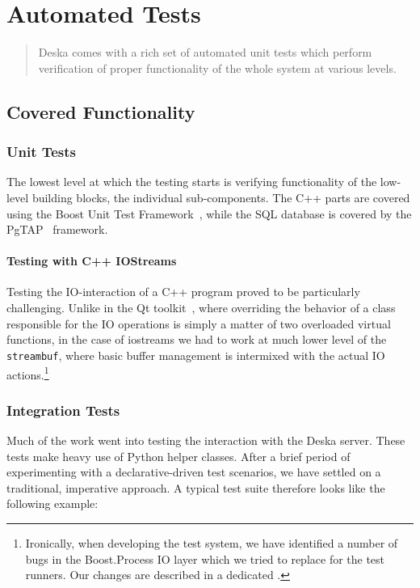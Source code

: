 \documentclass[deska]{subfiles}
\begin{document}
\chapter{Automated Tests}
\label{sec:automated-tests}

\begin{abstract}
Deska comes with a rich set of automated unit tests which perform verification of proper functionality of the whole
system at various levels.
\end{abstract}

\section{Covered Functionality}

\subsection{Unit Tests}

The lowest level at which the testing starts is verifying functionality of the low-level building blocks, the individual
sub-components.  The C++ parts are covered using the Boost Unit Test Framework~\cite{boost-testing}, while the SQL
database is covered by the PgTAP~\cite{pgtap} framework.

\subsubsection{Testing with C++ IOStreams}

Testing the IO-interaction of a C++ program proved to be particularly challenging.  Unlike in the Qt toolkit~\cite{qt},
where overriding the behavior of a class responsible for the IO operations is simply a matter of two overloaded virtual
functions, in the case of iostreams we had to work at much lower level of the {\tt streambuf}, where basic buffer
management is intermixed with the actual IO actions.\footnote{Ironically, when developing the test system, we have
identified a number of bugs in the Boost.Process IO layer which we tried to replace for the test runners.  Our changes
are described in a dedicated .}

\subsection{Integration Tests}

Much of the work went into testing the interaction with the Deska server.  These tests make heavy use of Python helper
classes.  After a brief period of experimenting with a declarative-driven test scenarios, we have settled on a
traditional, imperative approach.  A typical test suite therefore looks like the following example:
\end{document}

